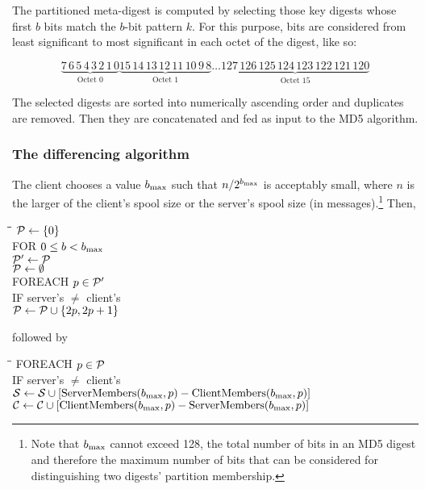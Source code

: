 The partitioned meta-digest  is computed by selecting those
key digests whose first $b$ bits match the $b$-bit pattern $k$.  For
this purpose, bits are considered from least significant to most
significant in each octet of the digest, like so:

\begin{displaymath}
\underbrace{7\,6\,5\,4\,3\,2\,1\,0}_{\mbox{Octet
0}}\underbrace{15\,14\,13\,12\,11\,10\,9\,8}_{\mbox{Octet
1}}\ldots{}\underbrace{127\,126\,125\,124\,123\,122\,121\,120}_{\mbox{Octet
15}}
\end{displaymath}

The selected digests are sorted into numerically ascending order and
duplicates are removed.  Then they are concatenated and fed as input
to the MD5 algorithm.

\subsubsection{The differencing algorithm}

The client chooses a value ${b_{\rm max}}{}$ such that $n/2^{b_{\rm max}}{}$ is
acceptably small, where $n$ is the larger of the client's spool size
or the server's spool size (in messages).\footnote{Note that ${b_{\rm max}}{}$
cannot exceed 128, the total number of bits in an MD5 digest and
therefore the maximum number of bits that can be considered for
distinguishing two digests' partition membership.}  Then,

\begin{tabbing}
\hspace*{.125in}\=\hspace*{.125in}\=\hspace*{.125in}\=\kill
${\cal P} \gets \{0\}$ \\
FOR $0 \leq b < {b_{\rm max}}{}$ \\
\>${\cal P'} \gets {\cal P}$ \\
\>${\cal P} \gets \emptyset$ \\
\>FOREACH $p \in {\cal P'}$ \\
\>\>IF server's  $\not=$ client's  \\
\>\>\>${\cal P} \gets {\cal P} \cup \{2p, 2p+1\}$
\end{tabbing}

\noindent
followed by

\begin{tabbing}
\hspace*{.125in}\=\hspace*{.125in}\=\kill
FOREACH $ p \in {\cal P} $ \\
\>IF server's  $\not=$ client's  \\
\>\>${\cal S} \gets {\cal S} \cup [\mbox{ServerMembers}({b_{\rm max}}{},p) - \mbox{ClientMembers}({b_{\rm max}}{},p)]$ \\
\>\>${\cal C} \gets {\cal C} \cup [\mbox{ClientMembers}({b_{\rm max}}{},p) - \mbox{ServerMembers}({b_{\rm max}}{},p)]$ \\
\end{tabbing}

